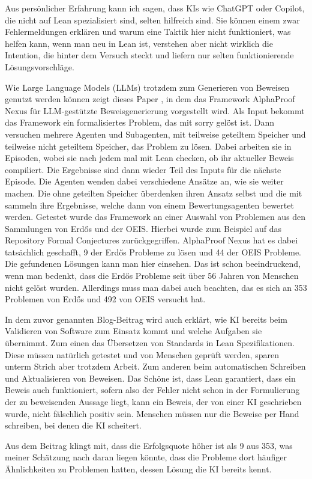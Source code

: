 Aus persönlicher Erfahrung kann ich sagen, dass KIs wie ChatGPT oder Copilot, die nicht auf Lean spezialisiert sind, selten hilfreich sind.
Sie können einem zwar Fehlermeldungen erklären und warum eine Taktik hier nicht funktioniert, was helfen kann, wenn man neu in Lean ist,
verstehen aber nicht wirklich die Intention, die hinter dem Versuch steckt und liefern nur selten funktionierende Lösungsvorschläge.

Wie Large Language Models (LLMs) trotzdem zum Generieren von Beweisen genutzt werden können zeigt dieses Paper \cite{tsoukalas2026advancingmathematicsresearchaidriven},
in dem das Framework AlphaProof Nexus für LLM-gestützte Beweisgenerierung vorgestellt wird.
Als Input bekommt das Framework ein formalisiertes Problem, das mit sorry gelöst ist.
Dann versuchen mehrere Agenten und Subagenten, mit teilweise geteiltem Speicher und teilweise nicht geteiltem Speicher, das Problem zu lösen.
Dabei arbeiten sie in Episoden, wobei sie nach jedem mal mit Lean checken, ob ihr aktueller Beweis compiliert.
Die Ergebnisse sind dann wieder Teil des Inputs für die nächste Episode.
Die Agenten wenden dabei verschiedene Ansätze an, wie sie weiter machen.
Die ohne geteilten Speicher überdenken ihren Ansatz selbst und die mit sammeln ihre Ergebnisse, welche dann von einem Bewertungsagenten bewertet werden.
Getestet wurde das Framework an einer Auswahl von Problemen aus den Sammlungen von Erdős und der OEIS.
Hierbei wurde zum Beispiel auf das Repository Formal Conjectures zurückgegriffen.
AlphaProof Nexus hat es dabei tatsächlich geschafft, 9 der Erdős Probleme zu lösen und 44 der OEIS Probleme.
Die gefundenen Lösungen kann man hier\cite{alphaproof_nexus_results} einsehen.
Das ist schon beeindruckend, wenn man bedenkt, dass die Erdős Probleme seit über 56 Jahren von Menschen nicht gelöst wurden.
Allerdings muss man dabei auch beachten, das es sich an 353 Problemen von Erdős und 492 von OEIS versucht hat.

In dem zuvor genannten Blog-Beitrag\cite{microsoftresearchblog} wird auch erklärt, wie KI bereits beim Validieren von Software zum Einsatz kommt und welche Aufgaben sie übernimmt.
Zum einen das Übersetzen von Standards in Lean Spezifikationen.
Diese müssen natürlich getestet und von Menschen geprüft werden, sparen unterm Strich aber trotzdem Arbeit.
Zum anderen beim automatischen Schreiben und Aktualisieren von Beweisen.
Das Schöne ist, dass Lean garantiert, dass ein Beweis auch funktioniert, sofern also der Fehler nicht schon in der Formulierung der zu beweisenden Aussage liegt,
kann ein Beweis, der von einer KI geschrieben wurde, nicht fälschlich positiv sein.
Menschen müssen nur die Beweise per Hand schreiben, bei denen die KI scheitert.

Aus dem Beitrag klingt mit, dass die Erfolgsquote höher ist als 9 aus 353, was meiner Schätzung nach daran liegen könnte,
dass die Probleme dort häufiger Ähnlichkeiten zu Problemen hatten, dessen Lösung die KI bereits kennt.

